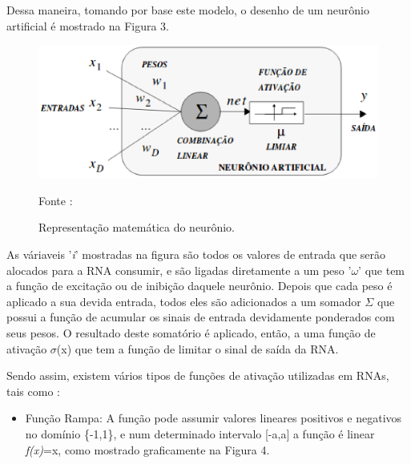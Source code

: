     Dessa maneira, tomando por base este modelo, o desenho de um neurônio artificial é mostrado na Figura 3.

    \begin{figure}[ht]
        \centering
        \label{fig03}
            \includegraphics[keepaspectratio=true, scale=0.4]{editaveis/images/modeloNeuronio.eps}
        \caption{Representação matemática do neurônio.}
        Fonte : \cite{rauber2005}
    \end{figure}

    As váriaveis '\textit{i}' mostradas na figura são todos os valores de entrada que serão alocados para a RNA consumir, e são ligadas diretamente a um peso '$\omega$' que tem a função de excitação ou de inibição daquele neurônio.
    Depois que cada peso é aplicado a sua devida entrada, todos eles são adicionados a um somador $\Sigma$ que possui a função de acumular os sinais de entrada devidamente ponderados com seus pesos. O resultado deste somatório é aplicado, então, a uma função de ativação $\sigma$(x) que tem a função de limitar o sinal de saída da RNA.

    Sendo assim, existem vários tipos de funções de ativação utilizadas em RNAs, tais como \cite{Distractions2016}:

    \begin{itemize}
        \item Função Rampa: A função pode assumir valores lineares positivos e negativos no domínio \{-1,1\}, e num determinado intervalo [-a,a] a função é linear \textit{f(x)}=x, como mostrado graficamente na Figura 4.
    \end{itemize}

